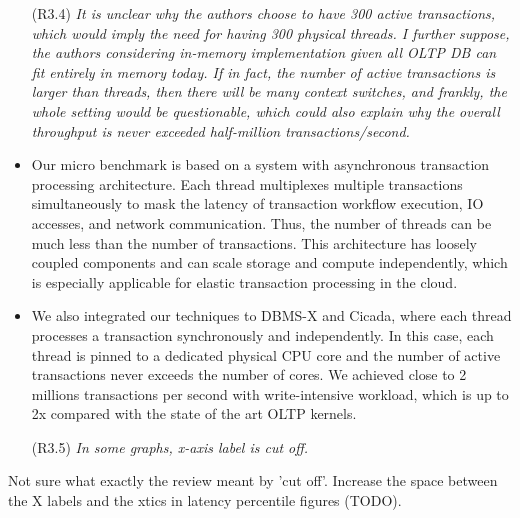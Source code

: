 \documentclass{article}
\newcommand{\changed}[1]{#1}
\newcommand{\changed}[1]{{\color{blue}#1}}
\begin{document}
\begin{itemize}
\item[(R3.4)] \emph{It is unclear why the authors choose to have 300 active transactions,
	which would imply the need for having 300 physical threads. I further
	suppose, the authors considering in-memory implementation given all OLTP
	DB can fit entirely in memory today. If in fact, the number of active
	transactions is larger than threads, then there will be many context switches,
	and frankly, the whole setting would be questionable, which could also
	explain why the overall throughput is never exceeded half-million
	transactions/second.}
\end{itemize}

\changed{
	\begin{itemize}
		\item Our micro benchmark is based on a system with asynchronous transaction processing architecture. Each thread multiplexes multiple transactions simultaneously to mask the latency of transaction workflow execution, IO accesses, and network communication. Thus, the number of threads can be much less than the number of transactions. This architecture has loosely coupled components and can scale storage and compute independently, which is especially applicable for elastic transaction processing in the cloud.
		\item We also integrated our techniques to DBMS-X and Cicada, where each thread processes a transaction synchronously and independently. In this case, each thread is pinned to a dedicated physical CPU core and the number of active transactions never exceeds the number of cores. We achieved close to 2 millions transactions per second with write-intensive workload, which is up to 2x compared with the state of the art OLTP kernels.  
		 
	\end{itemize}
}

\begin{itemize}
\item[(R3.5)] \emph{In some graphs, x-axis label is cut off.}
\end{itemize}

\changed{
	Not sure what exactly the review meant by 'cut off'. Increase the space between the X labels and the xtics in latency percentile figures (TODO).
}
\end{document}
